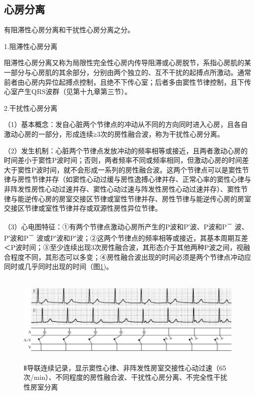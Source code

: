 \subsection{心房分离}

有阻滞性心房分离和干扰性心房分离之分。

1.阻滞性心房分离

阻滞性心房分离又称为局限性完全性心房内传导阻滞或心房脱节，系指心房肌的某一部分与心房肌的其余部分，分别由两个独立的、互不干扰的起搏点所激动。通常前者由心房内异位起搏点控制，且绝不下传心室；后者多由窦性节律控制，且下传心室产生QRS波群（见第十九章第三节）。

2.干扰性心房分离

（1）基本概念：发自心脏两个节律点的冲动从不同的方向同时进入心房，且各自激动心房的一部分，形成连续≥3次的房性融合波，称为干扰性心房分离。

（2）发生机制：心脏两个节律点发放冲动的频率相等或接近，且两者激动心房的时间差小于窦性P波时间；否则，两者频率不同或频率相同，但激动心房的时间差大于窦性P波时间，就不会形成一系列的房性融合波。这两个节律点可以是窦性节律与房性节律并存（如窦性心动过缓与房性逸搏心律并存、正常心率的窦性心律与非阵发性房性心动过速并存、窦性心动过速与阵发性房性心动过速并存）、窦性节律与能逆传心房的房室交接区节律或室性节律并存、房性节律与能逆传心房的房室交接区节律或室性节律并存或双源性房性异位节律。

（3）心电图特征：①有两个节律点激动心房所产生的P波和P′波、P波和P\textsuperscript{－}
波、P′波和P\textsuperscript{－}
波或P′波和P′波；②这两个节律点的频率相等或接近，其基本周期互差＜P波时间；③至少连续出现3次房性融合波，其形态介于其他两种P波之间，视融合程度不同，其形态可以多变；④房性融合波出现的时间必须是两个节律点冲动应同时或几乎同时出现的时间（图\ref{fig30-2})。

\begin{figure}[!htbp]
 \centering
 \includegraphics[width=5.80208in,height=1.75in]{./images/Image00497.jpg}
 \captionsetup{justification=centering}
 \caption{Ⅱ导联连续记录，显示窦性心律、非阵发性房室交接性心动过速（65次/min）、不同程度的房性融合波、干扰性心房分离、不完全性干扰性房室分离}
 \label{fig30-2}
  \end{figure} 

